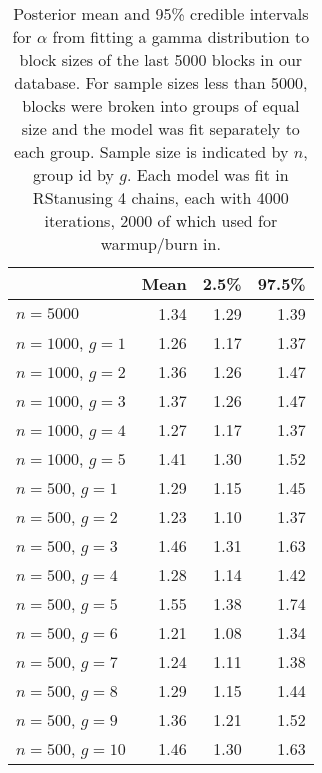 \documentclass{article}
\begin{document}
\begin{table}[ht]
\centering
\begin{tabular}{lrrr}
  \hline
 & Mean & 2.5\% & 97.5\% \\ 
  \hline
       $n=5000$ & 1.34 & 1.29 & 1.39 \\ 
$n=1000$, $g=1$ & 1.26 & 1.17 & 1.37 \\ 
$n=1000$, $g=2$ & 1.36 & 1.26 & 1.47 \\ 
$n=1000$, $g=3$ & 1.37 & 1.26 & 1.47 \\ 
$n=1000$, $g=4$ & 1.27 & 1.17 & 1.37 \\ 
$n=1000$, $g=5$ & 1.41 & 1.30 & 1.52 \\ 
 $n=500$, $g=1$ & 1.29 & 1.15 & 1.45 \\ 
 $n=500$, $g=2$ & 1.23 & 1.10 & 1.37 \\ 
 $n=500$, $g=3$ & 1.46 & 1.31 & 1.63 \\ 
 $n=500$, $g=4$ & 1.28 & 1.14 & 1.42 \\ 
 $n=500$, $g=5$ & 1.55 & 1.38 & 1.74 \\ 
 $n=500$, $g=6$ & 1.21 & 1.08 & 1.34 \\ 
 $n=500$, $g=7$ & 1.24 & 1.11 & 1.38 \\ 
 $n=500$, $g=8$ & 1.29 & 1.15 & 1.44 \\ 
 $n=500$, $g=9$ & 1.36 & 1.21 & 1.52 \\ 
 $n=500$, $g=10$ & 1.46 & 1.30 & 1.63 \\ 
 \hline
\end{tabular}
\caption{Posterior mean and 95\% credible intervals for $\alpha$ from fitting a gamma distribution to block sizes of the last 5000 blocks in our database. For sample sizes less than 5000, blocks were broken into groups of equal size and the model was fit separately to each group. Sample size is indicated by $n$, group id by $g$. Each model was fit in RStan\protect\footnotemark using 4 chains, each with 4000 iterations, 2000 of which used for warmup/burn in.}
\label{tab:gammafit}
\end{table}
\end{document}
